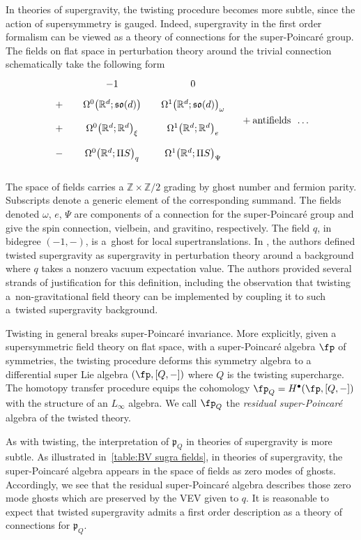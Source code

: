 \documentclass[pdftex]{sigma}
\numberwithin{equation}{section}
\theoremstyle{definition}
\def\R{\mathbb{R}}
\def\Z{\mathbb{Z}}
\begin{document}
In theories of supergravity, the twisting procedure becomes more subtle, since the action of supersymmetry is gauged. Indeed, supergravity in the first order formalism can be viewed as a theory of connections for the super-Poincar\'e group. The fields on flat space in perturbation theory around the trivial connection schematically take the following form
\begin{equation}\label{table:BV sugra fields}
\begin{tikzcd}[column sep=small, row sep=tiny]
& -1 & 0 & \\
+ & \Omega^0 \bigl(\R^d; \mathfrak{so}(d) \bigr) & \Omega^1 \bigl(\R^d; \mathfrak{so}(d) \bigr)_\omega \\
+ & \Omega^0 \bigl(\R^d; \R^d \bigr)_\xi & \Omega^1 \bigl(\R^d; \R^d\bigr)_e \\
- & \Omega^0 \bigl(\R^d; \Pi S \bigr)_q & \Omega^1 \bigl(\R^d; \Pi S\bigr)_\Psi \\
\end{tikzcd} + \text{antifields \ \dots}
\end{equation}

The space of fields carries a $\Z\times \Z/2$ grading by ghost number and fermion parity. Subscripts denote a generic element of the corresponding summand. The fields denoted $\omega$, $e$, $\Psi$ are components of a connection for the super-Poincar\'e group and give the spin connection, vielbein, and gravitino, respectively. The field $q$, in bidegree $(-1, -)$, is a~ghost for local supertranslations. In \cite{CostelloLi}, the authors defined twisted supergravity as supergravity in perturbation theory around a background where $q$ takes a nonzero vacuum expectation value. The authors provided several strands of justification for this definition, including the observation that twisting a~non-gravitational field theory can be implemented by coupling it to such a~twisted supergravity background.


Twisting in general breaks super-Poincar\'e invariance. More explicitly, given a supersymmetric field theory on flat space, with a super-Poincar\'e algebra $\fp$ of symmetries, the twisting procedure deforms this symmetry algebra to a differential super Lie algebra $(\fp,[Q,-])$ where $Q$ is the twisting supercharge. The homotopy transfer procedure equips the cohomology $\fp_Q = H^\bullet(\fp, [Q,-])$ with the structure of an $L_\infty$ algebra. We call $\fp_Q$ the \textit{residual super-Poincar\'e} algebra of the twisted theory.

As with twisting, the interpretation of $\mathfrak{p}_Q$ in theories of supergravity is more subtle. As illustrated in~\eqref{table:BV sugra fields}, in theories of supergravity, the super-Poincar\'e algebra appears in the space of fields as zero modes of ghosts. Accordingly, we see that the residual super-Poincar\'e algebra describes those zero mode ghosts which are preserved by the VEV given to $q$. It is reasonable to expect that twisted supergravity admits a first order description as a theory of connections for $\mathfrak{p}_Q$.
\end{document}

